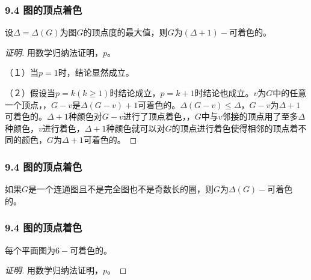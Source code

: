 \documentclass{beamer}
\begin{document}
\begin{CJK}{UTF8}{gbsn}

\begin{frame}
  \frametitle{9.4 图的顶点着色}
  \begin{Thm}
    设$\Delta = \Delta (G)$为图$G$的顶点度的最大值，则$G$为$(\Delta+1)-$可着色的。
  \end{Thm}
 \pause \begin{proof}[证明]\justifying\let\raggedright\justifying
   \pause 用数学归纳法证明，$p$。

   \pause （１）当$p=1$时，结论显然成立。

   \pause （２）假设当$p=k(k\geq 1)$时结论成立，$p=k+1$时结论也成立。$v$为$G$中的任意一个顶点，，\pause$G-v$是$\Delta(G-v)+1$可着色的。$\Delta(G-v) \leq \Delta$，$G-v$为$\Delta+1$可着色的。$\Delta+1$种颜色对$G-v$进行了顶点着色，，$G$中与$v$邻接的顶点用了至多$\Delta$种颜色，$v$进行着色，$\Delta+1$种颜色就可以对$G$的顶点进行着色使得相邻的顶点着不同的颜色，$G$为$\Delta + 1$可着色的。
  \end{proof}
\end{frame}
\begin{frame}
  \frametitle{9.4 图的顶点着色}
  \begin{Thm}
    如果$G$是一个连通图且不是完全图也不是奇数长的圈，则$G$为$\Delta(G)-$可着色的。
  \end{Thm}
\end{frame}
\begin{frame}
  \frametitle{9.4 图的顶点着色}
  \begin{Thm}
    每个平面图为$6-$可着色的。
  \end{Thm}
     \pause \begin{proof}[证明]\justifying\let\raggedright\justifying
   \pause 用数学归纳法证明，$p$。


\end{proof}
\end{frame}
\end{CJK}
\end{document}
